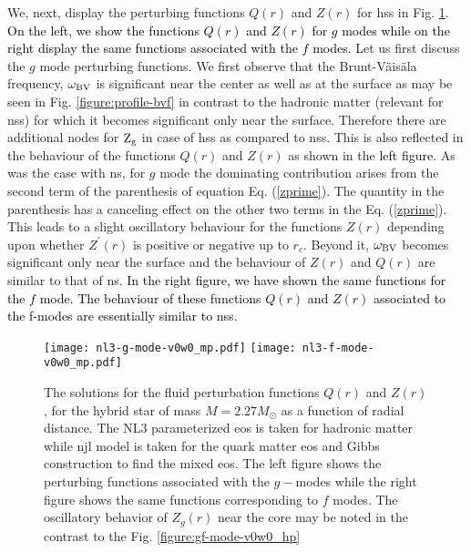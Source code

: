 \documentclass[a4paper, 11pt]{article}
\newcommand{\magenta}[1]{\textcolor{black}{#1}}
\begin{document}
{We, next, display the perturbing functions $Q(r)$ and $Z(r)$ for \ac{hs}s in Fig. \ref{figure:gf-mode-v0w0_mp}. 
\magenta {On the left, we show the  functions $Q(r)$ and $Z(r)$ for $g$ modes while  on the right display the same
functions associated with the $f$ modes.} Let us first discuss the $g$ mode perturbing functions. We first 
observe that the Brunt-V\"ais\"ala frequency, $\omega_{\rm BV}$ is significant near the center as well as at the
 surface as may be seen in Fig. \ref{figure:profile-bvf} in contrast to the hadronic matter (relevant for \ac{ns}s) 
for which it becomes significant only near the surface. Therefore there are additional nodes for ${\rm Z_g}$ in case of
 \ac{hs}s as compared to \ac{ns}s. This is also reflected in the behaviour of the functions $Q(r)$ and $Z(r)$ as shown 
in the \magenta{left figure}. As was the case with \ac{ns}, for $g$ mode the dominating contribution arises from
 the second term of the parenthesis of equation Eq. (\ref{zprime}). The quantity in the parenthesis has a 
canceling effect on the other two terms in the Eq. (\ref{zprime}). This leads to a slight oscillatory behaviour
 for the functions $Z(r)$ depending upon whether $Z^{\prime}(r)$ is positive or negative up to $r_c$. Beyond it, 
$\omega_{\rm BV}$ becomes significant only near the surface and the behaviour of $Z(r)$ and $Q(r)$ are similar 
to that of \ac{ns}. \magenta {In the right figure, we have shown the same functions for the $f$ mode. The behaviour of these 
functions $Q(r)$ and $Z(r)$  associated to the f-modes are essentially similar to \ac{ns}s. }

\begin{figure}
\centering
\texttt{[image: nl3-g-mode-v0w0\_mp.pdf]}
\texttt{[image: nl3-f-mode-v0w0\_mp.pdf]}
\caption{The solutions for the fluid perturbation functions $Q(r)$ and $Z(r)$, for the hybrid star 
of mass $M=2.27M_{\odot}$ as a function of radial distance. The NL3 parameterized \ac{eos} is taken
 for hadronic matter while \ac{njl} model is taken for the quark matter \ac{eos} and Gibbs construction to
 find the mixed \ac{eos}. The left figure shows the perturbing functions associated with the $g-$modes  while
the right figure shows the same functions corresponding to $f$ modes. The oscillatory behavior of $Z_g(r)$ near the core
 may be noted in the contrast to the Fig. \ref{figure:gf-mode-v0w0_hp}}
\label{figure:gf-mode-v0w0_mp}
\end{figure}






}
\end{document}
